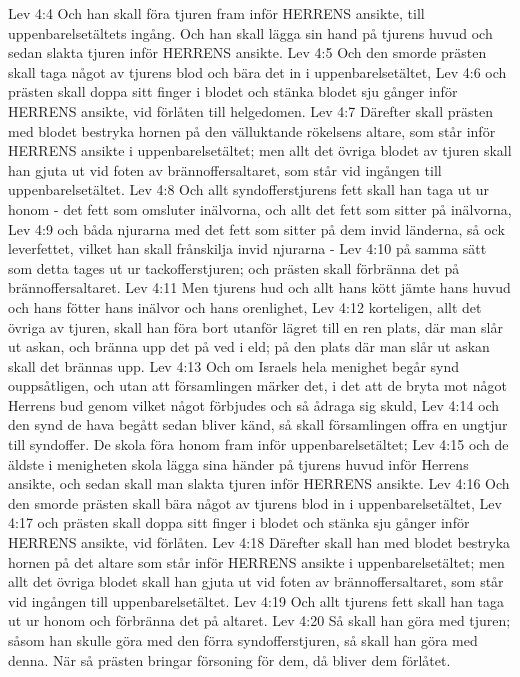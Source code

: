 Lev 4:4  Och han skall föra tjuren fram inför HERRENS ansikte, till uppenbarelsetältets ingång. Och han skall lägga sin hand på tjurens huvud och sedan slakta tjuren inför HERRENS ansikte.
Lev 4:5  Och den smorde prästen skall taga något av tjurens blod och bära det in i uppenbarelsetältet,
Lev 4:6  och prästen skall doppa sitt finger i blodet och stänka blodet sju gånger inför HERRENS ansikte, vid förlåten till helgedomen.
Lev 4:7  Därefter skall prästen med blodet bestryka hornen på den välluktande rökelsens altare, som står inför HERRENS ansikte i uppenbarelsetältet; men allt det övriga blodet av tjuren skall han gjuta ut vid foten av brännoffersaltaret, som står vid ingången till uppenbarelsetältet.
Lev 4:8  Och allt syndofferstjurens fett skall han taga ut ur honom - det fett som omsluter inälvorna, och allt det fett som sitter på inälvorna,
Lev 4:9  och båda njurarna med det fett som sitter på dem invid länderna, så ock leverfettet, vilket han skall frånskilja invid njurarna -
Lev 4:10  på samma sätt som detta tages ut ur tackofferstjuren; och prästen skall förbränna det på brännoffersaltaret.
Lev 4:11  Men tjurens hud och allt hans kött jämte hans huvud och hans fötter hans inälvor och hans orenlighet,
Lev 4:12  korteligen, allt det övriga av tjuren, skall han föra bort utanför lägret till en ren plats, där man slår ut askan, och bränna upp det på ved i eld; på den plats där man slår ut askan skall det brännas upp.
Lev 4:13  Och om Israels hela menighet begår synd ouppsåtligen, och utan att församlingen märker det, i det att de bryta mot något Herrens bud genom vilket något förbjudes och så ådraga sig skuld,
Lev 4:14  och den synd de hava begått sedan bliver känd, så skall församlingen offra en ungtjur till syndoffer. De skola föra honom fram inför uppenbarelsetältet;
Lev 4:15  och de äldste i menigheten skola lägga sina händer på tjurens huvud inför Herrens ansikte, och sedan skall man slakta tjuren inför HERRENS ansikte.
Lev 4:16  Och den smorde prästen skall bära något av tjurens blod in i uppenbarelsetältet,
Lev 4:17  och prästen skall doppa sitt finger i blodet och stänka sju gånger inför HERRENS ansikte, vid förlåten.
Lev 4:18  Därefter skall han med blodet bestryka hornen på det altare som står inför HERRENS ansikte i uppenbarelsetältet; men allt det övriga blodet skall han gjuta ut vid foten av brännoffersaltaret, som står vid ingången till uppenbarelsetältet.
Lev 4:19  Och allt tjurens fett skall han taga ut ur honom och förbränna det på altaret.
Lev 4:20  Så skall han göra med tjuren; såsom han skulle göra med den förra syndofferstjuren, så skall han göra med denna. När så prästen bringar försoning för dem, då bliver dem förlåtet.
